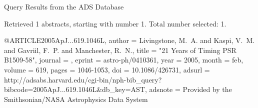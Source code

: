 Query Results from the ADS Database


Retrieved 1 abstracts, starting with number 1.  Total number selected: 1.

@ARTICLE{2005ApJ...619.1046L,
   author = {{Livingstone}, M.~A. and {Kaspi}, V.~M. and {Gavriil}, F.~P. and 
	{Manchester}, R.~N.},
    title = "{21 Years of Timing PSR B1509-58}",
  journal = {\apj},
   eprint = {astro-ph/0410361},
     year = 2005,
    month = feb,
   volume = 619,
    pages = {1046-1053},
      doi = {10.1086/426731},
   adsurl = {http://adsabs.harvard.edu/cgi-bin/nph-bib_query?bibcode=2005ApJ...619.1046L&db_key=AST},
  adsnote = {Provided by the Smithsonian/NASA Astrophysics Data System}
}



